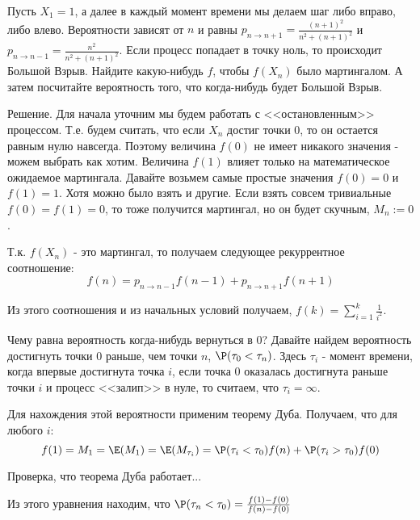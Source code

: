 {%






\begin{myex}
Пусть $X_{1}=1$, а далее в каждый момент времени мы делаем шаг либо вправо, либо влево. Вероятности зависят от $n$ и равны $p_{n\to n+1}=\frac{(n+1)^{2}}{n^{2}+(n+1)^{2}}$ и  $p_{n\to n-1}=\frac{n^{2}}{n^{2}+(n+1)^{2}}$. Если процесс попадает в точку ноль, то происходит Большой Взрыв. Найдите какую-нибудь $f$, чтобы $f(X_{n})$ было мартингалом. А затем посчитайте вероятность того, что когда-нибудь будет Большой Взрыв.

Решение. Для начала уточним мы будем работать с <<остановленным>> процессом. Т.е. будем считать, что если $X_{n}$ достиг точки $0$, то он остается равным нулю навсегда. Поэтому величина $f(0)$ не имеет никакого значения - можем выбрать как хотим. Величина $f(1)$ влияет только на математическое ожидаемое мартингала. Давайте возьмем самые простые значения $f(0)=0$ и $f(1)=1$. Хотя можно было взять и другие. Если взять совсем тривиальные $f(0)=f(1)=0$, то тоже получится мартингал, но он будет скучным, $M_{n}:=0$.

Т.к. $f(X_{n})$ - это мартингал, то получаем следующее рекуррентное соотношение:
\begin{equation}
f(n)=p_{n\to n-1} f(n-1)+p_{n\to n+1} f(n+1)
\end{equation}

Из этого соотношения и из начальных условий получаем, $f(k)=\sum_{i=1}^{k}\frac{1}{i^{2}}$. 

Чему равна вероятность когда-нибудь вернуться в 0? Давайте найдем вероятность достигнуть точки $0$ раньше, чем точки $n$, $\P(\tau_{0}<\tau_{n})$. Здесь $\tau_{i}$ - момент времени, когда впервые достигнута точка $i$, если точка $0$ оказалась достигнута раньше точки $i$ и процесс <<залип>> в нуле, то считаем, что $\tau_{i}=\infty$.

Для нахождения этой вероятности применим теорему Дуба. Получаем, что для любого $i$:
\begin{equation}
f(1)=M_{1}=\E(M_{1})=\E(M_{\tau_{i}})=\P(\tau_{i}<\tau_{0})f(n)+\P(\tau_{i}>\tau_{0})f(0)
\end{equation}

Проверка, что теорема Дуба работает...

Из этого уравнения находим, что $\P(\tau_{n}<\tau_{0})=\frac{f(1)-f(0)}{f(n)-f(0)}$


\end{myex}}

